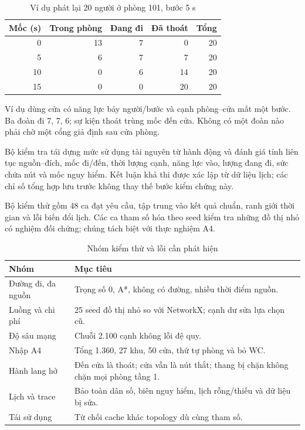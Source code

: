 \begin{table}[htbp]\centering\caption{Ví dụ phát lại 20 người ở phòng 101, bước 5 s}
\small\begin{tabular}{rrrrr}\toprule Mốc (s) & Trong phòng & Đang đi & Đã thoát & Tổng\\\midrule
0 & 13 & 7 & 0 & 20\\
5 & 6 & 7 & 7 & 20\\
10 & 0 & 6 & 14 & 20\\
15 & 0 & 0 & 20 & 20\\\bottomrule\end{tabular}\end{table}
Ví dụ dùng cửa có năng lực bảy người/bước và cạnh phòng--cửa mất một bước. Ba đoàn đi 7, 7, 6; sự kiện thoát trùng mốc đến cửa. Không có một đoàn nào phải chờ một cổng giả định sau cửa phòng.

Bộ kiểm tra tái dựng mức sử dụng tài nguyên từ hành động và đánh giá tính liên tục nguồn--đích, mốc đi/đến, thời lượng cạnh, năng lực vào, lượng đang đi, sức chứa nút và mốc nguy hiểm. Kết luận khả thi được xác lập từ dữ liệu lịch; các chỉ số tổng hợp lưu trước không thay thế bước kiểm chứng này.

Bộ kiểm thử gồm 48 ca đạt yêu cầu, tập trung vào kết quả chuẩn, ranh giới thời gian và lỗi biến đổi lịch. Các ca tham số hóa theo seed kiểm tra những đồ thị nhỏ có nghiệm đối chứng; chúng tách biệt với thực nghiệm A4.

\begin{table}[htbp]\centering\caption{Nhóm kiểm thử và lỗi cần phát hiện}
\small\begin{tabularx}{\linewidth}{P{4.2cm}X}\toprule
Nhóm & Mục tiêu\\\midrule
Đường đi, đa nguồn & Trọng số 0, A*, không có đường, nhiều thời điểm nguồn.\\
Luồng và chi phí & 25 seed đồ thị nhỏ so với NetworkX; cạnh dư sửa lựa chọn cũ.\\
Độ sâu mạng & Chuỗi 2.100 cạnh không lỗi đệ quy.\\
Nhập A4 & Tổng 1.360, 27 khu, 50 cửa, thứ tự phòng và bỏ WC.\\
Hành lang hở & Đến cửa là thoát; cửa vẫn là nút thắt; thang bị chặn không chặn mọi phòng tầng 1.\\
Lịch và trace & Bảo toàn dân số, biên nguy hiểm, lịch rỗng/thiếu và dữ liệu bị sửa.\\
Tái sử dụng & Từ chối cache khác topology dù cùng tham số.\\\bottomrule
\end{tabularx}\end{table}

